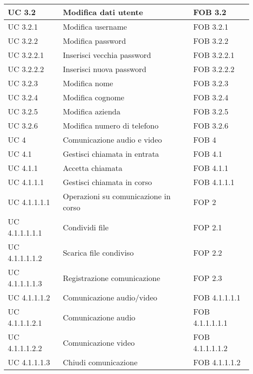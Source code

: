 \begin{longtable}{p{} p{} p{} }
\midrule
UC 3.2 & Modifica dati utente & FOB 3.2\\

\midrule
UC 3.2.1 & Modifica username & FOB 3.2.1\\

\midrule
UC 3.2.2 & Modifica password & FOB 3.2.2\\
\midrule
UC 3.2.2.1 & Inserisci vecchia password & FOB 3.2.2.1\\
\midrule
UC 3.2.2.2 & Inserisci nuova password & FOB 3.2.2.2\\

\midrule
UC 3.2.3 & Modifica nome & FOB 3.2.3\\

\midrule
UC 3.2.4 & Modifica cognome & FOB 3.2.4\\

\midrule
UC 3.2.5 & Modifica azienda & FOB 3.2.5\\

\midrule
UC 3.2.6 & Modifica numero di telefono & FOB 3.2.6\\


\midrule
UC 4 & Comunicazione audio e video & FOB 4\\

\midrule
UC 4.1 & Gestisci chiamata in entrata & FOB 4.1\\

\midrule
UC 4.1.1 & Accetta chiamata & FOB 4.1.1\\

\midrule
UC 4.1.1.1 & Gestisci chiamata in corso & FOB 4.1.1.1\\

\midrule
UC 4.1.1.1.1 & Operazioni su comunicazione in corso & FOP 2\\
\midrule
UC 4.1.1.1.1.1 & Condividi file & FOP 2.1\\
\midrule
UC 4.1.1.1.1.2 & Scarica file condiviso & FOP 2.2\\
\midrule
UC 4.1.1.1.1.3 & Registrazione comunicazione & FOP 2.3\\

\midrule
UC 4.1.1.1.2 & Comunicazione audio/video & FOB 4.1.1.1.1\\
\midrule
UC 4.1.1.1.2.1 & Comunicazione audio & FOB 4.1.1.1.1.1\\
\midrule
UC 4.1.1.1.2.2 & Comunicazione video & FOB 4.1.1.1.1.2\\

\midrule
UC 4.1.1.1.3 & Chiudi comunicazione & FOB 4.1.1.1.2\\


\end{longtable}
